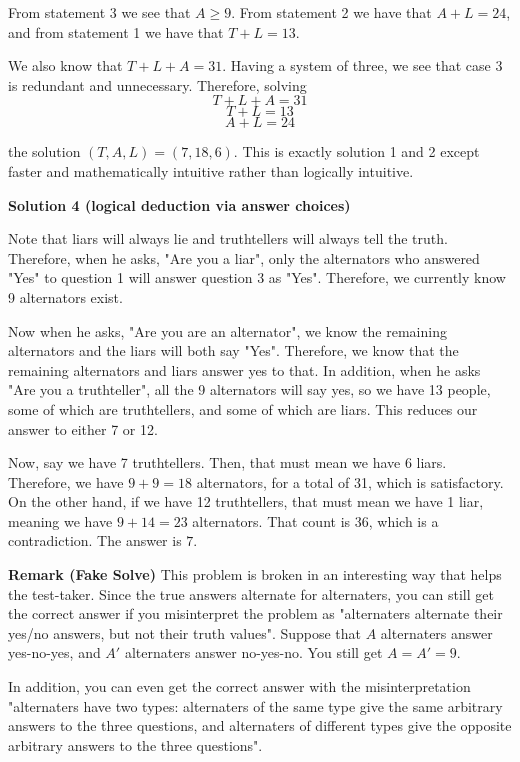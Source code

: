 \begin{enumerate}
 From statement 3 we see that $A \ge 9$. From statement 2 we have that $A+L = 24$, and from statement 1 we have that $T+L = 13$.

 We also know that $T+L+A = 31$. Having a system of three, we see that case 3 is redundant and unnecessary. Therefore, solving
 \[T+L+A=31\]
 \[T+L=13\]
 \[A+L=24\]

 the solution $(T,A,L) = (\boxed{7},18,6)$. This is exactly solution 1 and 2 except faster and mathematically intuitive rather than logically intuitive. 

 



\textbf{Solution 4 (logical deduction via answer choices)}

Note that liars will always lie and truthtellers will always tell the truth. Therefore, when he asks, "Are you a liar", only the alternators who answered "Yes" to question 1 will answer question 3 as "Yes". Therefore, we currently know 9 alternators exist.

 Now when he asks, "Are you are an alternator", we know the remaining alternators and the liars will both say "Yes". Therefore, we know that the remaining alternators and liars answer yes to that. In addition, when he asks "Are you a truthteller", all the 9 alternators will say yes, so we have 13 people, some of which are truthtellers, and some of which are liars. This reduces our answer to either 7 or 12.

 Now, say we have 7 truthtellers. Then, that must mean we have 6 liars. Therefore, we have $9+9=18$ alternators, for a total of 31, which is satisfactory. On the other hand, if we have 12 truthtellers, that must mean we have 1 liar, meaning we have $9+14 = 23$ alternators. That count is 36, which is a contradiction. The answer is $\boxed{7}$.

 \textbf{Remark (Fake Solve)} This problem is broken in an interesting way that helps the test-taker. Since the true answers alternate for alternaters, you can still get the correct answer if you misinterpret the problem as "alternaters alternate their yes/no answers, but not their truth values". Suppose that $A$ alternaters answer yes-no-yes, and $A'$ alternaters answer no-yes-no. You still get $A=A'=9$. 

 In addition, you can even get the correct answer with the misinterpretation "alternaters have two types: alternaters of the same type give the same arbitrary answers to the three questions, and alternaters of different types give the opposite arbitrary answers to the three questions".


\end{enumerate}

